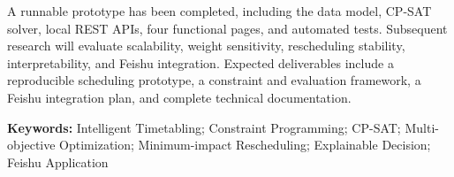 A runnable prototype has been completed, including the data model, CP-SAT
solver, local REST APIs, four functional pages, and automated tests. Subsequent
research will evaluate scalability, weight sensitivity, rescheduling stability,
interpretability, and Feishu integration. Expected deliverables include a
reproducible scheduling prototype, a constraint and evaluation framework, a
Feishu integration plan, and complete technical documentation.

\vspace{1em}
\noindent\textbf{Keywords:} Intelligent Timetabling; Constraint Programming;
CP-SAT; Multi-objective Optimization; Minimum-impact Rescheduling;
Explainable Decision; Feishu Application
\clearpage
